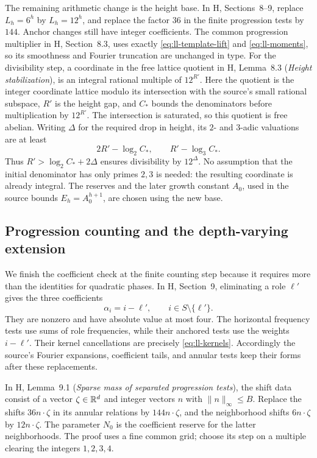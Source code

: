 The remaining arithmetic change is the height base.  In H,
Sections~8--9, replace $L_h=6^h$ by $L_h=12^h$, and replace the
factor $36$ in the finite progression tests by $144$.  Anchor changes
still have integer coefficients.  The common progression multiplier
in H, Section~8.3, uses exactly \eqref{eq:ll-template-lift} and
\eqref{eq:ll-moments}, so its smoothness and Fourier truncation are
unchanged in type.  For the divisibility step, a coordinate in the
free lattice quotient in H, Lemma~8.3 (\emph{Height stabilization}),
is an integral rational multiple of $12^{R'}$.  Here the quotient
is the integer coordinate lattice modulo its intersection with the
source's small rational subspace, $R'$ is the height gap, and $C_*$
bounds the denominators before multiplication by $12^{R'}$.
The intersection is saturated, so this quotient is free abelian.
Writing $\Delta$ for the required drop in height, its $2$- and $3$-adic
valuations are at least
\[
 2R'-\log_2 C_*,\qquad R'-\log_3 C_*.
\]
Thus $R'>\log_2C_*+2\Delta$ ensures divisibility by $12^\Delta$.
No assumption that the initial denominator has only primes $2,3$ is
needed: the resulting coordinate is already integral.  The reserves
and the later growth constant $A_0$, used in the source bounds
$E_h=A_0^{h+1}$, are chosen using the new base.

\subsection{Progression counting and the depth-varying extension}

We finish the coefficient check at the finite counting step because
it requires more than the identities for quadratic phases.  In H,
Section~9, eliminating a role $\ell'$ gives the three coefficients
\[
 \alpha_i=i-\ell',\qquad i\in S\setminus\{\ell'\}.
\]
They are nonzero and have absolute value at most four.  The
horizontal frequency tests use sums of role frequencies, while their
anchored tests use the weights $i-\ell'$.  Their kernel cancellations
are precisely \eqref{eq:ll-kernels}.  Accordingly the source's
Fourier expansions, coefficient tails, and annular tests keep their
forms after these replacements.

In H, Lemma~9.1 (\emph{Sparse mass of separated progression tests}),
the shift data consist of a vector $\zeta\in\mathbb R^d$ and integer
vectors $n$ with $\|n\|_\infty\le B$.  Replace the shifts
$36n\cdot\zeta$ in its annular relations by $144n\cdot\zeta$,
and the neighborhood shifts $6n\cdot\zeta$ by $12n\cdot\zeta$.
The parameter $N_0$ is the coefficient reserve for the latter
neighborhoods.  The proof uses a fine common grid; choose its step
on a multiple clearing the integers $1,2,3,4$.

